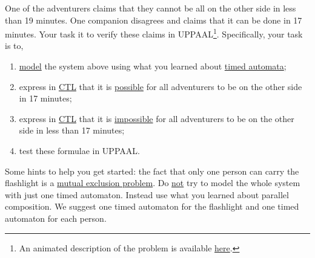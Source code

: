 \documentclass[11pt]{article}
\theoremstyle{myplain}
\theoremstyle{definition} %
\begin{document}
One of the adventurers claims that they cannot be all on the other
side in less than 19 minutes. One companion disagrees and claims that
it can be done in 17 minutes. Your task it to verify these claims in
\textsc{UPPAAL}\footnote{An animated description of the problem is
  available
  \href{https://www.youtube.com/watch?v=7yDmGnA8Hw0}{here}.}. Specifically,
your task is to,
\begin{enumerate}
\item \underline{model} the system above using what you learned about
  \underline{timed automata};
\item express in \underline{\textsc{CTL}} that it is
  \underline{possible} for all adventurers to be on the other side in
  17 minutes;
\item express in \underline{\textsc{CTL}} that it is
  \underline{impossible} for all adventurers to be on the other side
  in less than 17 minutes;
\item test these formulae in \textsc{UPPAAL}.
\end{enumerate}
\bigskip
\noindent
Some hints to help you get started: the fact that only one person can
carry the flashlight is a \underline{mutual exclusion problem}. 
Do \underline{not} try to model the whole system with just one timed
automaton. Instead use what you learned about parallel
composition. We suggest one timed automaton for the flashlight and
one timed automaton for each person.
\end{document}
